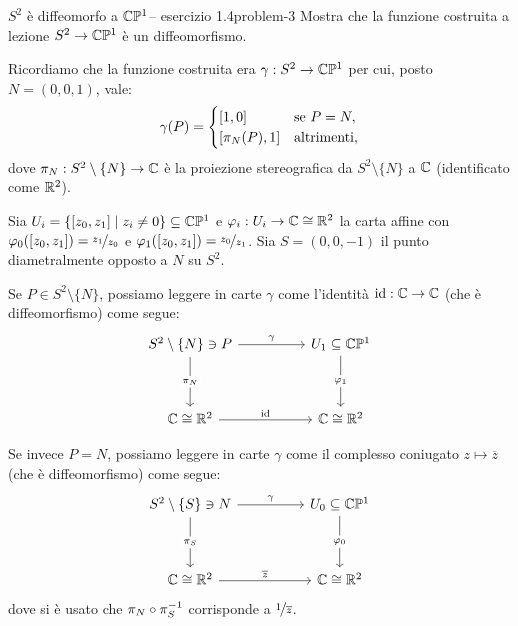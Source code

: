 \documentclass[letterpaper, 11pt]{extarticle}
\begin{document}
\begin{problem}{$S^2$ è diffeomorfo a $\mathbb{C} \mathbb{P}^1$-- esercizio 1.4}{problem-3}
Mostra che la funzione costruita a lezione $S^2 \to \mathbb{C} \mathbb{P}^1$ è un diffeomorfismo.
\end{problem}

\begin{solution}
    Ricordiamo che la funzione costruita era $\gamma : S^2 \to \mathbb{C} \mathbb{P}^1$ per cui, posto
    $N = (0, 0, 1)$, vale:
    \[
        \gamma(P) = \begin{cases}
            [1, 0]        & \text{se } P = N,   \\
            [\pi_N(P), 1] & \text{altrimenti},
        \end{cases}
    \]
    dove $\pi_N : S^2 \setminus \{N\} \to \mathbb{C}$ è la proiezione stereografica da $S^2 \setminus \{N\}$
    a $\mathbb{C}$ (identificato come $\mathbb{R}^2$). \smallskip

    Sia $U_i = \{ [z_0, z_1] \mid z_i \neq 0 \} \subseteq \mathbb{C} \mathbb{P}^1$ e $\varphi_i : U_i \to \mathbb{C} \cong \mathbb{R}^2$ la carta
    affine con $\varphi_0([z_0, z_1]) = \nicefrac{z_1}{z_0}$ e $\varphi_1([z_0, z_1]) = \nicefrac{z_0}{z_1}$. Sia
    $S = (0, 0, -1)$ il punto diametralmente opposto a $N$ su $S^2$. \smallskip

    Se $P \in S^2 \setminus \{N\}$, possiamo leggere in carte $\gamma$ come l'identità $\operatorname{id} : \mathbb{C} \to \mathbb{C}$ (che è diffeomorfismo) come segue:
    \[\begin{tikzcd}
            {S^2 \setminus \{N\} \ni P} && {U_1 \subseteq \CC \PP^1} \\
            \\
            {\CC \cong \RR^2} && {\CC \cong \RR^2}
            \arrow["\gamma", from=1-1, to=1-3]
            \arrow["{\pi_N}"{description}, from=1-1, to=3-1]
            \arrow["{\varphi_1}"{description}, from=1-3, to=3-3]
            \arrow["\id", from=3-1, to=3-3]
        \end{tikzcd}\]

    Se invece $P = N$, possiamo leggere in carte $\gamma$ come il complesso coniugato $z \mapsto \overline{z}$ (che è diffeomorfismo) come segue:
    \[\begin{tikzcd}
            {S^2 \setminus \{S\} \ni N} && {U_0 \subseteq \CC \PP^1} \\
            \\
            {\CC \cong \RR^2} && {\CC \cong \RR^2}
            \arrow["\gamma", from=1-1, to=1-3]
            \arrow["{\pi_S}"{description}, from=1-1, to=3-1]
            \arrow["{\varphi_0}"{description}, from=1-3, to=3-3]
            \arrow["{\overline{z}}", from=3-1, to=3-3]
        \end{tikzcd}\]
    dove si è usato che $\pi_N \circ \pi_S^{-1}$ corrisponde a $\nicefrac{1}{\overline{z}}$.
\end{solution}
\end{document}
